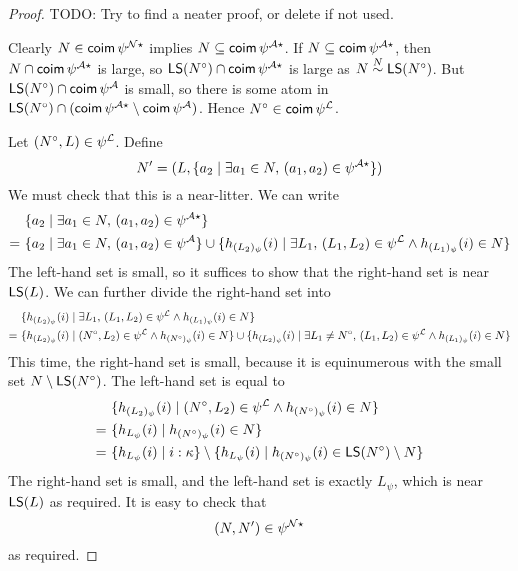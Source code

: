\begin{proof}
  TODO: Try to find a neater proof, or delete if not used.

  Clearly \( N \in \operatorname{\mathsf{coim}} \psi^{{\mathcal N}\star} \) implies \( N \subseteq \operatorname{\mathsf{coim}} \psi^{{\mathcal A}\star} \).
  If \( N \subseteq \operatorname{\mathsf{coim}} \psi^{{\mathcal A}\star} \), then \( N \cap \operatorname{\mathsf{coim}} \psi^{{\mathcal A}\star} \) is large, so \( \operatorname{\mathsf{LS}}(N^\circ) \cap \operatorname{\mathsf{coim}} \psi^{{\mathcal A}\star} \) is large as \( N \mathrel{\overset{N}{\sim}} \operatorname{\mathsf{LS}}(N^\circ) \).
  But \( \operatorname{\mathsf{LS}}(N^\circ) \cap \operatorname{\mathsf{coim}} \psi^{\mathcal A} \) is small, so there is some atom in \( \operatorname{\mathsf{LS}}(N^\circ) \cap (\operatorname{\mathsf{coim}} \psi^{{\mathcal A}\star} \setminus \operatorname{\mathsf{coim}} \psi^{\mathcal A}) \).
  Hence \( N^\circ \in \operatorname{\mathsf{coim}} \psi^{\mathcal L} \).

  Let \( (N^\circ, L) \in \psi^{\mathcal L} \).
  Define
  \[ N' = (L, \{ a_2 \mid \exists a_1 \in N,\, (a_1, a_2) \in \psi^{{\mathcal A}\star} \}) \]
  We must check that this is a near-litter.
  We can write
  \begin{align*}
    &\{ a_2 \mid \exists a_1 \in N,\, (a_1, a_2) \in \psi^{{\mathcal A}\star} \} \\
    =\ &\{ a_2 \mid \exists a_1 \in N,\, (a_1, a_2) \in \psi^{\mathcal A} \} \cup \{ h_{(L_2)_\psi}(i) \mid \exists L_1,\, (L_1, L_2) \in \psi^{\mathcal L} \wedge h_{(L_1)_\psi}(i) \in N \}
  \end{align*}
  The left-hand set is small, so it suffices to show that the right-hand set is near \( \operatorname{\mathsf{LS}}(L) \).
  We can further divide the right-hand set into
  \begin{align*}
    &\{ h_{(L_2)_\psi}(i) \mid \exists L_1,\, (L_1, L_2) \in \psi^{\mathcal L} \wedge h_{(L_1)_\psi}(i) \in N \} \\
    =\ &\{ h_{(L_2)_\psi}(i) \mid (N^\circ, L_2) \in \psi^{\mathcal L} \wedge h_{(N^\circ)_\psi}(i) \in N \} \cup \{ h_{(L_2)_\psi}(i) \mid \exists L_1 \neq N^\circ,\, (L_1, L_2) \in \psi^{\mathcal L} \wedge h_{(L_1)_\psi}(i) \in N \}
  \end{align*}
  This time, the right-hand set is small, because it is equinumerous with the small set \( N \setminus \operatorname{\mathsf{LS}}(N^\circ) \).
  The left-hand set is equal to
  \begin{align*}
    &\{ h_{(L_2)_\psi}(i) \mid (N^\circ, L_2) \in \psi^{\mathcal L} \wedge h_{(N^\circ)_\psi}(i) \in N \} \\
    =\ &\{ h_{L_\psi}(i) \mid h_{(N^\circ)_\psi}(i) \in N \} \\
    =\ &\{ h_{L_\psi}(i) \mid i : \kappa \} \setminus \{ h_{L_\psi}(i) \mid h_{(N^\circ)_\psi}(i) \in \operatorname{\mathsf{LS}}(N^\circ) \setminus N \}
  \end{align*}
  The right-hand set is small, and the left-hand set is exactly \( L_\psi \), which is near \( \operatorname{\mathsf{LS}}(L) \) as required.
  It is easy to check that
  \[ (N, N') \in \psi^{{\mathcal N}\star} \]
  as required.
\end{proof}
